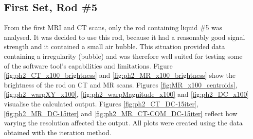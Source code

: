\subsection{First Set, Rod \#5}

From the first MRI and CT scans, only the rod containing liquid \#5 was analysed.
It was decided to use this rod, because it had a reasonably good signal strength and it contained a small air bubble.
This situation provided data containing a irregularity (bubble) and was therefore well suited for testing some of the software tool's capabilities and limitations.
Figure \ref{fig:ph2_CT_x100_brightness} and \ref{fig:ph2_MR_x100_brightness} show the brightness of the rod on CT and MR scans.
Figures \ref{fig:MR_x100_centroids}, \ref{fig:ph2_warpXY_x100}, \ref{fig:ph2_warpMagnitude_x100} and \ref{fig:ph2_DC_x100} visualise the calculated output.
Figures \ref{fig:ph2_CT_DC-15iter},  \ref{fig:ph2_MR_DC-15iter} and \ref{fig:ph2_MR_CT-COM_DC-15iter} reflect how varying the resolution affected the output.
All plots were created using the data obtained with the iteration method.

